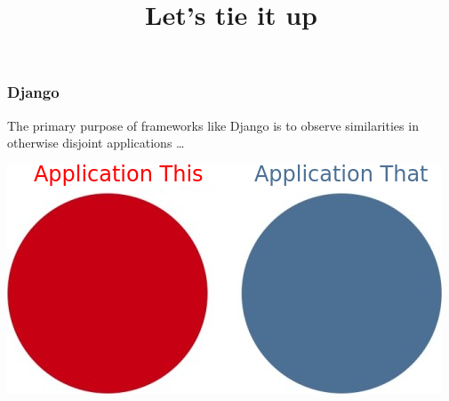 {


  \begin{frame}[plain] 
  \title{Let's tie it up}
  
  \vspace{3em}

  \begin{TitleBoxConclusion}
    \begin{center}
    {\Large \inserttitle}
    \end{center}
  \end{TitleBoxConclusion}

  \end{frame}
}


\begin{frame}
\frametitle{Django}
\begin{center}
The primary purpose of frameworks like Django is to observe similarities in otherwise disjoint applications \ldots
\end{center}
\vspace{3em}
\begin{center}
\includegraphics[width=0.4\paperwidth]{image/venn-disjoint.png}
\end{center}
\end{frame}


